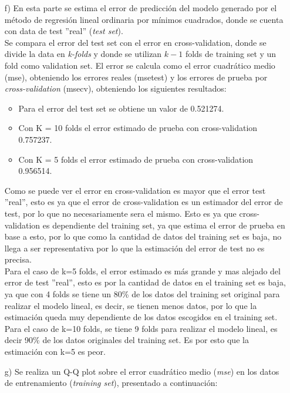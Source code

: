 \documentclass[10pt]{article}
\begin{document}
\begin{itemize}
\item[f)] En esta parte se estima el error de predicción del modelo generado por el método de regresión lineal ordinaria por mínimos cuadrados, donde se cuenta con data de test ''real'' (\textit{test set}).\\
Se compara el error del test set con el error en cross-validation, donde se divide la data en \textit{k-folds} y donde se utilizan $k-1$ folds de training set y un fold como validation set. El error se calcula como el error cuadrático medio (mse), obteniendo los errores reales (msetest) y los errores de prueba por \textit{cross-validation} (msecv), obteniendo los siguientes resultados:
\begin{itemize}
\item Para el error del test set se obtiene un valor de 0.521274.
\item Con K = 10 folds el error estimado de prueba con cross-validation  0.757237.
\item Con K = 5 folds el error estimado de prueba con cross-validation  0.956514.
\end{itemize}

Como se puede ver el error en cross-validation es mayor que el error test ''real'', esto es ya que el error de cross-validation es un estimador del error de test, por lo que no necesariamente sera el mismo. Esto es ya que cross-validation es dependiente del training set, ya que estima el error de prueba en base a esto, por lo que como la cantidad de datos del training set es baja, no llega a ser representativa por lo que la estimación del error de test no es precisa. \\

Para el caso de k=5 folds, el error estimado es más grande y mas alejado del error de test ''real'', esto es por la cantidad de datos en el training set es baja, ya que con 4 folds se tiene un 80\%  de los datos del training set original para realizar el modelo lineal, es decir, se tienen menos datos, por lo que la estimación queda muy dependiente de los datos escogidos en el training set. Para el caso de k=10 folds, se tiene 9 folds para realizar el modelo lineal, es decir 90\% de los datos originales del training set. Es por esto que la estimación con k=5 es peor.

\item[g)] Se realiza un Q-Q plot sobre el error cuadrático medio (\textit{mse}) en los datos de entrenamiento (\textit{training set}), presentado a continuación:\\


\end{itemize}
\end{document}
